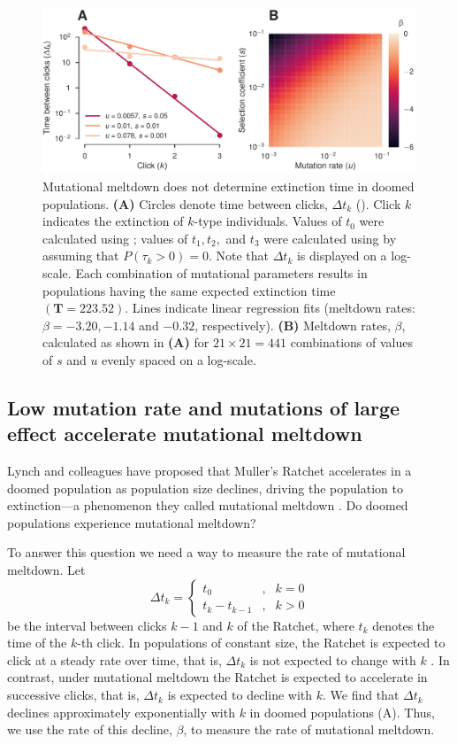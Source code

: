 \documentclass[9pt,lineno]{elife}
\begin{document}
\begin{figure}[ht!]
\centering
\includegraphics[width=.71\linewidth]{melt.pdf}
\caption{Mutational meltdown does not determine extinction time in doomed populations.  
%
\textbf{(A)} Circles denote time between clicks, $\Delta t_k$ ().  Click $k$ indicates the extinction of $k$-type individuals.  Values of $t_0$ were calculated using ; values of $t_1, t_2,$ and $t_3$ were calculated using  by assuming that $P(\tau_{k} > 0) = 0$.
Note that $\Delta t_k$ is displayed on a log-scale.  Each combination of mutational parameters results in populations having the same expected extinction time $(\mathbf{T} = 223.52)$.  Lines indicate linear regression fits (meltdown rates: $\beta = -3.20, -1.14$ and $-0.32$, respectively).
%
\textbf{(B)} Meltdown rates, $\beta$, calculated as shown in \textbf{(A)} for $21\times21=441$ combinations of values of $s$ and $u$ evenly spaced on a log-scale.
}
\label{fig:melt}
\end{figure}


\subsection{Low mutation rate and mutations of large effect accelerate mutational meltdown}

Lynch and colleagues have proposed that Muller's Ratchet accelerates in a doomed population as population size declines, driving the population to extinction---a phenomenon they called mutational meltdown \citep{Lynch_MUTATION_1990, lyn93, Gabriel_MULLER_1993}.  
Do doomed populations experience mutational meltdown?

To answer this question we need a way to measure the rate of mutational meltdown.  Let 
%
\begin{equation}
\Delta t_k = \left\{\begin{array}{lll}
%
    t_0               & , & k = 0       \\ [4pt]
	t_k - t_{k-1}     & , & k > 0
    \end{array}
%
\right. 
\label{eq:deltat}
\end{equation}
%
be the interval between clicks $k-1$ and $k$ of the Ratchet, where $t_k$ denotes the time of the $k$-th click.  
%
In populations of constant size, 
the Ratchet is expected to click at a steady rate over time, that is,
$\Delta t_k$ is not expected to change with $k$ \citep{Haigh_The_1978, Gordo_On_2000, gor00b}.  
%
In contrast, under mutational meltdown
the Ratchet is expected to accelerate in successive clicks, that is,
$\Delta t_k$ is expected to decline with $k$.
%
We find that $\Delta t_k$ declines approximately exponentially with $k$ in doomed populations (A).  Thus, we use the rate of this decline, $\beta$, to measure the rate of mutational meltdown.
\end{document}
